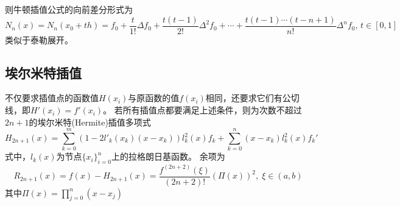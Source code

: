 则牛顿插值公式的向前差分形式为
\[N_n(x)=N_n(x_0+th)=f_0+\frac{t}{1!}\Delta f_0+\frac{t(t-1)}{2!}\Delta^2 f_0+\cdots+\frac{t(t-1)\cdots(t-n+1)}{n!}\Delta^n f_0,\,t\in[0,1]\]
类似于泰勒展开。

\subsection{埃尔米特插值}
不仅要求插值点的函数值$H(x_i)$与原函数的值$f(x_i)$相同，还要求它们有公切线，即$H'(x_i)=f'(x_i)$。
若所有插值点都要满足上述条件，则为次数不超过$2n+1$的埃尔米特(Hermite)插值多项式
\[H_{2n+1}(x)=\sum_{k=0}^m(1-2l'_k(x_k)(x-x_k))l_k^2(x)f_k+\sum_{k=0}^n(x-x_k)l_k^2(x)f_k'\]
式中，$l_k(x)$为节点$\{x_i\}_{i=0}^n$上的拉格朗日基函数。
余项为
\[R_{2n+1}(x)=f(x)-H_{2n+1}(x)=\frac{f^{(2n+2)}(\xi)}{(2n+2)!}(\Pi(x))^2,\;\xi\in(a,b)\]
其中$\Pi(x)=\prod_{j=0}^n(x-x_j)$

